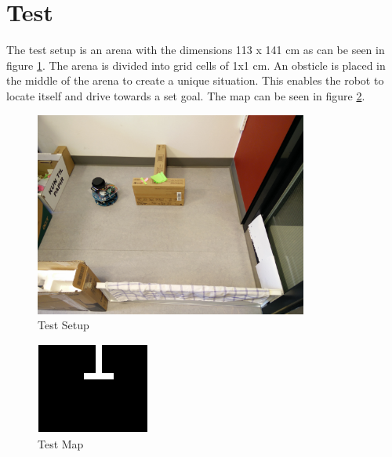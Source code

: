 \section{Test}
The test setup is an arena with the dimensions 113 x 141 cm as can be seen in figure \ref{fig:testsetup}. The arena is divided into grid cells of 1x1 cm. An obsticle is placed in the middle of the arena to create a unique situation. This enables the robot to locate itself and drive towards a set goal. The map can be seen in figure \ref{fig:map}.
\begin{figure}[H]
\centering
\includegraphics[width=0.8\textwidth]{billeder/testsetup}
\caption{Test Setup}
\label{fig:testsetup}
\end{figure}
\begin{figure}[H]
\centering
\includegraphics[scale=1]{billeder/map}
\caption{Test Map}
\label{fig:map}
\end{figure}